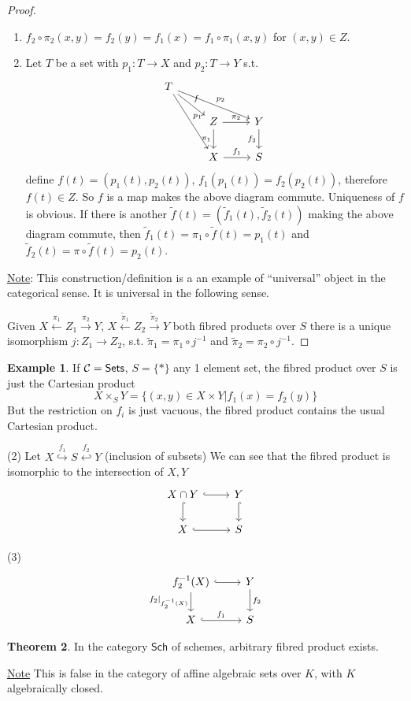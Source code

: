 \documentclass[11pt]{article}
\theoremstyle{definition}
\newtheorem{thm}{Theorem}[section]
\newtheorem{ex}[thm]{Example}
\newcommand{\calc}{{\cal C}}
\newcommand{\lrta}{\longrightarrow}
\newcommand{\inj}{\hookrightarrow}
\begin{document}
\begin{proof}
\ \begin{enumerate}[label=(\arabic*)]
\item $f_2\circ \pi_2(x,y)=f_2(y)=f_1(x)=f_1\circ \pi_1(x,y)$ for $(x,y)\in Z$.
\item Let $T$ be a set with $p_1:T\lrta X$ and $p_2:T\lrta Y$ s.t. $$\begin{tikzcd}
T \arrow[rdd,"p_1"] \arrow[rrd,"p_2"] \ar[rd,"f"] &  &  \\
 & Z \arrow[r, "\pi_2"] \arrow[d, "\pi_1"'] & Y \arrow[d, "f_2"'] \\
 & X \arrow[r, "f_1"] & S
\end{tikzcd}$$
define $f(t)=(p_1(t),p_2(t))$, $f_1(p_1(t))=f_2(p_2(t))$, therefore $f(t)\in Z$. So $f$ is a map makes the  above diagram commute. Uniqueness of $f$ is obvious. If there is  another $\tilde{f}(t)=(\tilde{f}_1(t),\tilde{f}_2(t))$ making the above diagram commute, then $\tilde{f}_1(t)=\pi_1\circ \tilde{f}(t)=p_1(t)$ and $\tilde{f}_2(t)=\pi\circ \tilde{f}(t)=p_2(t)$.
\end{enumerate}
\underline{Note}: This construction/definition is a an example of ``universal'' object in the categorical sense. It is universal in the following sense.

Given $X\overset{\pi_1}{\longleftarrow}Z_1\overset{\pi_2}{\lrta} Y$, $X\overset{\tilde{\pi}_1}{\longleftarrow}Z_2\overset{\tilde{\pi}_2}{\lrta} Y$ both fibred products over $S$ there is a unique isomorphism $j:Z_1\lrta Z_2$, s.t. $\tilde{\pi}_1=\pi_1\circ j^{-1}$ and $\tilde{\pi}_2=\pi_2\circ j^{-1}$.
\end{proof}
\begin{ex}
If $\calc=\mathsf{Sets}$, $S=\{*\}$ any 1 element set, the fibred product over $S$ is just the Cartesian product
$$
X\times_S Y=\{(x,y)\in X\times Y|f_1(x)=f_2(y)\}
$$
But the restriction on $f_i$ is just vacuous, the fibred product contains the usual Cartesian product.

(2) Let $X\overset{f_1}{\inj}S \overset{f_2}{\hookleftarrow} Y$ (inclusion of subsets) We can see that the fibred product is isomorphic to the intersection of $X,Y$
$$
\begin{tikzcd}
X\cap Y \arrow[d, hook] \arrow[r, hook] & Y \arrow[d, hook] \\
X \arrow[r, hook] & S
\end{tikzcd}
$$

(3) $$
\begin{tikzcd}
f_2^{-1}(X) \arrow[d, "f_2|_{f^{-1}_2(X)}"'] \arrow[r, hook] & Y \arrow[d, "f_2"] \\
X \arrow[r, "f_1", hook] & S
\end{tikzcd}
$$
\end{ex}
\begin{thm}
In the category $\mathsf{Sch}$ of schemes, arbitrary fibred product exists.
\end{thm}
\underline{Note} This is false in the category of affine algebraic sets over $K$, with $K$ algebraically closed.
\end{document}

